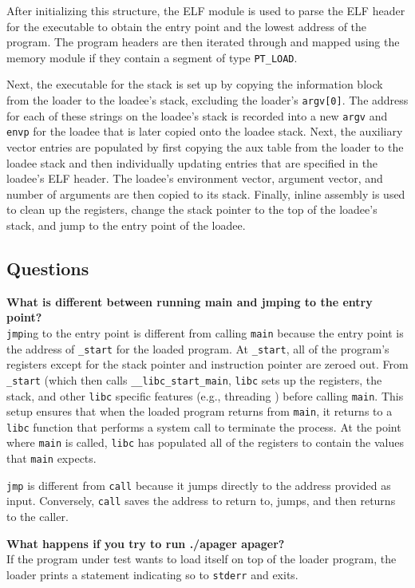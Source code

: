 \documentclass[a4paper]{article}
\begin{document}
{After initializing this structure, the ELF module is used to parse the ELF header for the executable to obtain the entry point and the lowest address of the program. The program headers are then iterated through and mapped using the memory module if they contain a segment of type \verb|PT_LOAD|. 

Next, the executable for the stack is set up by copying the information block from the loader to the loadee's stack, excluding the loader's \verb|argv[0]|. The address for each of these strings on the loadee's stack is recorded into a new \verb|argv| and \verb|envp| for the loadee that is later copied onto the loadee stack. Next, the auxiliary vector entries are populated by first copying the aux table from the loader to the loadee stack and then individually updating entries that are specified in the loadee's ELF header. The loadee's environment vector, argument vector, and number of arguments are then copied to its stack. Finally, inline assembly is used to clean up the registers, change the stack pointer to the top of the loadee's stack, and jump to the entry point of the loadee.


\subsection{Questions}
\textbf{What is different between running main and jmping to the entry point?}\\
\verb|jmp|ing to the entry point is different from calling \verb|main| because the entry point is the address of \verb|_start| for the loaded program. At \verb|_start|, all of the program's registers except for the stack pointer and instruction pointer are zeroed out. From \verb|_start| (which then calls \verb|__libc_start_main|, \verb|libc| sets up the registers, the stack, and other \verb|libc| specific features (e.g., threading ) before calling \verb|main|. This setup ensures that when the loaded program returns from \verb|main|, it returns to a \verb|libc| function that performs a system call to terminate the process. At the point where \verb|main| is called, \verb|libc| has populated all of the registers to contain the values that \verb|main| expects.

\verb|jmp| is different from \verb|call| because it jumps directly to the address provided as input. Conversely, \verb|call| saves the address to return to, jumps, and then returns to the caller.
        

\textbf{What happens if you try to run ./apager apager?}\\
If the program under test wants to load itself on top of the loader program, the loader prints a statement indicating so to \verb|stderr| and exits.
        
}
\end{document}

